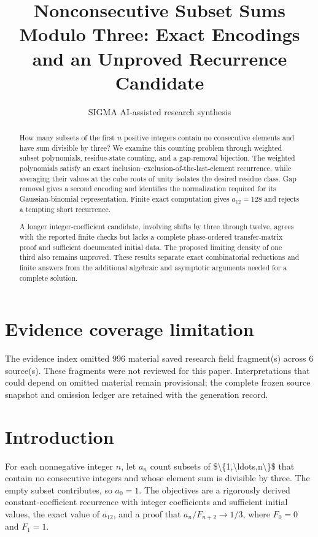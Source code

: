 \documentclass[11pt]{article}
\title{Nonconsecutive Subset Sums Modulo Three: Exact Encodings and an Unproved Recurrence Candidate}
\date{}
\author{SIGMA AI-assisted research synthesis}
\begin{document}
\maketitle

\begin{abstract}
How many subsets of the first $n$ positive integers contain no consecutive elements and have sum divisible by three? We examine this counting problem through weighted subset polynomials, residue-state counting, and a gap-removal bijection. The weighted polynomials satisfy an exact inclusion–exclusion-of-the-last-element recurrence, while averaging their values at the cube roots of unity isolates the desired residue class. Gap removal gives a second encoding and identifies the normalization required for its Gaussian-binomial representation. Finite exact computation gives $a_{12}=128$ and rejects a tempting short recurrence.

A longer integer-coefficient candidate, involving shifts by three through twelve, agrees with the reported finite checks but lacks a complete phase-ordered transfer-matrix proof and sufficient documented initial data. The proposed limiting density of one third also remains unproved. These results separate exact combinatorial reductions and finite answers from the additional algebraic and asymptotic arguments needed for a complete solution.
\end{abstract}
\section*{Evidence coverage limitation}
The evidence index omitted 996 material saved research field fragment(s) across 6 source(s). These fragments were not reviewed for this paper. Interpretations that could depend on omitted material remain provisional; the complete frozen source snapshot and omission ledger are retained with the generation record.
\section{Introduction}
For each nonnegative integer $n$, let $a_n$ count subsets of \$\textbackslash{}\{1,\textbackslash{}ldots,n\textbackslash{}\}\$ that contain no consecutive integers and whose element sum is divisible by three. The empty subset contributes, so $a_0=1$. The objectives are a rigorously derived constant-coefficient recurrence with integer coefficients and sufficient initial values, the exact value of $a_{12}$, and a proof that $a_n/F_{n+2}\to 1/3$, where $F_0=0$ and $F_1=1$.
\end{document}
